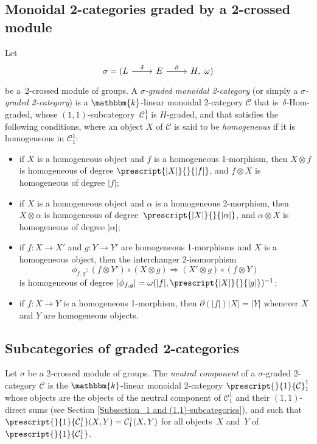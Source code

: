\documentclass[a4paper, oneside]{amsart}
\numberwithin{equation}{subsection}
\theoremstyle{referencedlemma}
\theoremstyle{plain} %
\theoremstyle{remark}
\begin{document}
\subsection{Monoidal 2-categories graded by a 2-crossed module} Let
$$
\begin{tikzcd}
\sigma = (L \arrow{r}{\delta} & E \arrow{r}{\partial} & H,\ \omega)
\end{tikzcd}
$$
be a~2-crossed module of groups.  A \emph{$\sigma$-graded monoidal 2-category} (or simply a \emph{$\sigma$-graded 2-category}) is a $\mathbbm{k}$-linear monoidal 2-category $\mathcal{C}$ that is~\mbox{$\delta$-Hom-graded}, whose $(1,1)$-subcate\-gory~$\mathcal{C}^1_1$ is $H$-graded, and that satisfies the following conditions, where an object $X$ of $\mathcal{C}$ is said to be \emph{homogeneous} if it is homogeneous in $\mathcal{C}_1^1$: 
\begin{itemize}
    \item if $X$ is a homogeneous object and $f$ is a homogeneous 1-morphism, then $X\otimes f$ is homogeneous of degree $\prescript{\lvert X\rvert }{}{\lvert f \rvert}$, and $f\otimes X$ is homogeneous of degree $\lvert f \rvert$;
    \item if $X$ is a homogeneous object and $\alpha$ is a homogeneous 2-morphism,  then $ X\otimes \alpha$ is homogeneous of degree~$\prescript{\lvert X \rvert}{}{\lvert \alpha\rvert}$, and $ \alpha\otimes X$ is homogeneous of degree $\lvert \alpha\rvert$;
    \item if $f\colon X\to X'$ and $g\colon Y\to Y'$ are homogeneous 1-morphisms and $X$ is a homogeneous object, then the interchanger 2-isomorphism
    \begin{equation*}
    \phi_{f,g} \colon (f\otimes Y')\circ (X\otimes g) \Rightarrow (X'\otimes g)\circ (f\otimes Y)
    \end{equation*}
    is homogeneous of degree $\lvert \phi_{f,g}\rvert = \omega(\lvert f \rvert, \prescript{\lvert X\rvert }{}{\lvert g \rvert })^{-1}$;
    \item if $f\colon X\to Y$ is a homogeneous 1-morphism, then $\partial(\lvert f \rvert ) \lvert X \rvert = \lvert Y \rvert$ whenever $X$ and $Y$ are homogeneous objects. 
\end{itemize}

\subsection{Subcategories of graded 2-categories}\label{Section-neutral component} Let $\sigma$ be a 2-crossed module of groups.  The \emph{neutral component} of a $\sigma$-graded 2-category $\mathcal{C}$ is the $\mathbbm{k}$-linear monoidal 2-category $\prescript{}{1}{\mathcal{C}}_1^1$ whose objects are the objects of the neutral component of $\mathcal{C}^1_1$ and their $(1,1)$-direct sums (see Section \ref{Subsection_1 and (1,1)-subcategories}), and such that $\prescript{}{1}{\mathcal{C}_1^1}(X,Y) = \mathcal{C}_1^1(X,Y)$ for all objects~$X$ and~$Y$ of~$\prescript{}{1}{\mathcal{C}_1^1}$. 
\end{document}
